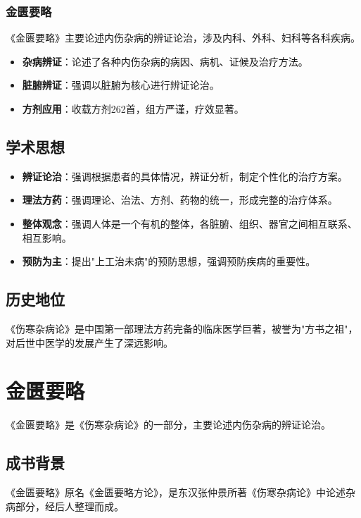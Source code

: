 \documentclass[12pt,UTF8]{ctexbook}
\begin{document}
\subsubsection{金匮要略}

《金匮要略》主要论述内伤杂病的辨证论治，涉及内科、外科、妇科等各科疾病。

\begin{itemize}
\item \textbf{杂病辨证}：论述了各种内伤杂病的病因、病机、证候及治疗方法。
\item \textbf{脏腑辨证}：强调以脏腑为核心进行辨证论治。
\item \textbf{方剂应用}：收载方剂262首，组方严谨，疗效显著。
\end{itemize}

\subsection{学术思想}

\begin{itemize}
\item \textbf{辨证论治}：强调根据患者的具体情况，辨证分析，制定个性化的治疗方案。
\item \textbf{理法方药}：强调理论、治法、方剂、药物的统一，形成完整的治疗体系。
\item \textbf{整体观念}：强调人体是一个有机的整体，各脏腑、组织、器官之间相互联系、相互影响。
\item \textbf{预防为主}：提出"上工治未病"的预防思想，强调预防疾病的重要性。
\end{itemize}

\subsection{历史地位}

《伤寒杂病论》是中国第一部理法方药完备的临床医学巨著，被誉为"方书之祖"，对后世中医学的发展产生了深远影响。

\section{金匮要略}

《金匮要略》是《伤寒杂病论》的一部分，主要论述内伤杂病的辨证论治。

\subsection{成书背景}

《金匮要略》原名《金匮要略方论》，是东汉张仲景所著《伤寒杂病论》中论述杂病部分，经后人整理而成。
\end{document}
